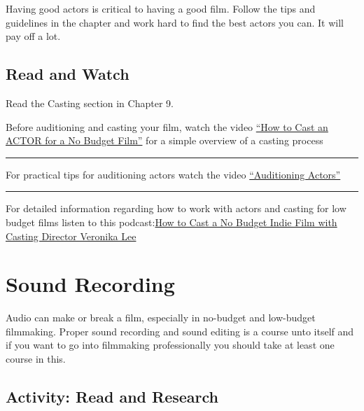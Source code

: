 \documentclass[
]{book}
\begin{document}
Having good actors is critical to having a good film. Follow the tips and guidelines in the chapter and work hard to find the best actors you can. It will pay off a lot.

\hypertarget{read-and-watch-1}{%
\subsection*{Read and Watch}\label{read-and-watch-1}}

\begin{reflect}
Read the Casting section in Chapter 9.

Before auditioning and casting your film, watch the video \href{https://www.youtube.com/watch?v=YpCkRPqsiJ4}{``How to Cast an ACTOR for a No Budget Film''} for a simple overview of a casting process

\begin{center}\rule{0.5\linewidth}{0.5pt}\end{center}

For practical tips for auditioning actors watch the video \href{https://www.youtube.com/watch?v=x0G6n346m90}{``Auditioning Actors''}

\begin{center}\rule{0.5\linewidth}{0.5pt}\end{center}

For detailed information regarding how to work with actors and casting for low budget films listen to this podcast:\href{https://www.youtube.com/watch?v=-DwKilT0T34}{How to Cast a No Budget Indie Film with Casting Director Veronika Lee}
\end{reflect}

\hypertarget{sound-recording}{%
\section{Sound Recording}\label{sound-recording}}

Audio can make or break a film, especially in no-budget and low-budget filmmaking. Proper sound recording and sound editing is a course unto itself and if you want to go into filmmaking professionally you should take at least one course in this.

\hypertarget{activity-read-and-research}{%
\subsection*{Activity: Read and Research}\label{activity-read-and-research}}
\end{document}
